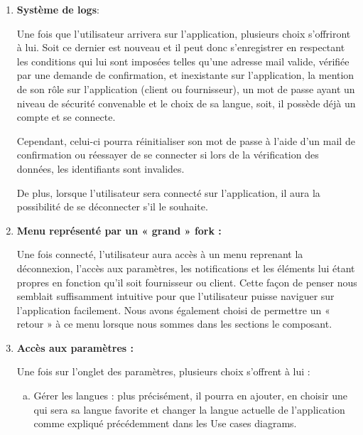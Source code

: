\begin{enumerate}[1.]
\item  \textbf{Système de logs}:\newline 

Une fois que l’utilisateur arrivera sur l’application, plusieurs choix s’offriront à lui. Soit ce dernier est nouveau et il peut donc s’enregistrer en respectant les conditions qui lui sont imposées telles qu’une adresse mail valide, vérifiée par une demande de confirmation, et inexistante sur l’application, la mention de son rôle sur l’application (client ou fournisseur), un mot de passe ayant un niveau de sécurité convenable et le choix de sa langue, soit, il possède déjà un compte et se connecte. \newline

Cependant, celui-ci pourra réinitialiser son mot de passe à l’aide d’un mail de confirmation ou réessayer de se connecter si lors de la vérification des données, les identifiants sont invalides.\newline

De plus, lorsque l’utilisateur sera connecté sur l’application, il aura la possibilité de se déconnecter s’il le souhaite.

\item \textbf{Menu représenté par un « grand » fork :}\newline

Une fois connecté, l’utilisateur aura accès à un menu reprenant la déconnexion, l’accès aux paramètres, les notifications et les éléments lui étant propres en fonction qu’il soit fournisseur ou client. \newline
Cette façon de penser nous semblait suffisamment intuitive pour que l’utilisateur puisse naviguer sur l’application facilement. 
Nous avons également choisi de permettre un « retour » à ce menu lorsque nous sommes dans les sections le composant.

\item \textbf{Accès aux paramètres :}\newline

Une fois sur l’onglet des paramètres, plusieurs choix s’offrent à lui : 

\begin{enumerate}[a)]

\item Gérer les langues : plus précisément, il pourra en ajouter, en choisir une qui sera sa langue favorite et changer la langue actuelle de l'application comme expliqué précédemment dans les Use cases diagrams.


\end{enumerate}
\end{enumerate}
